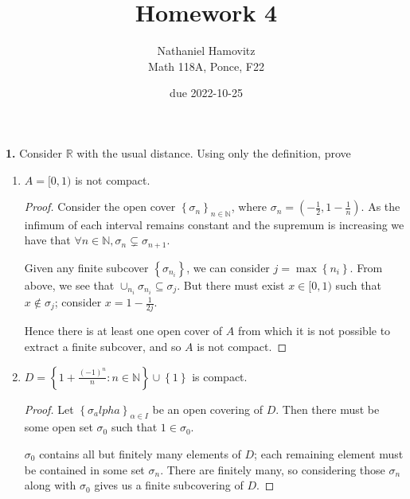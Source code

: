 \documentclass{article}
\newcommand{\R}{\mathbb{R}}
\newcommand{\N}{\mathbb{N}}
\newcommand{\set}[1]{\left\{ #1 \right\}}
\newcommand{\paren}[1]{\left( #1 \right)}
\begin{document}
\renewcommand{\labelenumi}{(\alph{enumi})}


\title{Homework 4} %
\author{Nathaniel Hamovitz\\Math 118A, Ponce, F22}
\date{due 2022-10-25}

\maketitle

\textbf{1. }
Consider $\R$ with the usual distance. Using only the definition, prove

\begin{enumerate}
    \item  %
    $A = [0, 1)$ is not compact.
    \begin{proof}
        Consider the open cover $\set{\sigma_n}_{n \in \N}$, where $\sigma_n = \paren{-\frac{1}{2}, 1 - \frac{1}{n}}$. As the infimum of each interval remains constant and the supremum is increasing we have that $\forall n \in \N, \sigma_n \subsetneq \sigma_{n + 1}$. 
        
        Given any finite subcover $\set{\sigma_{n_i}}$, we can consider $j = \max \set{n_i}$. From above, we see that $\cup_{n_i} \sigma_{n_i} \subseteq \sigma_j$. But there must exist $x \in [0, 1)$ such that $x \notin \sigma_j$; consider $x = 1 - \frac{1}{2j}$. 

        Hence there is at least one open cover of $A$ from which it is not possible to extract a finite subcover, and so $A$ is not compact.
    \end{proof}


    \item  %
    $D = \set{1 + \frac{(-1)^{n}}{n} : n \in \N} \cup \set{1}$ is compact.
    \begin{proof}
        Let $\set{\sigma_alpha}_{\alpha \in I}$ be an open covering of $D$. Then there must be some open set $\sigma_0$ such that $1 \in \sigma_0$. 

        $\sigma_0$ contains all but finitely many elements of $D$; each remaining element must be contained in some set $\sigma_n$. There are finitely many, so considering those $\sigma_n$ along with $\sigma_0$ gives us a finite subcovering of $D$.        
    \end{proof}
\end{enumerate}
\end{document}
